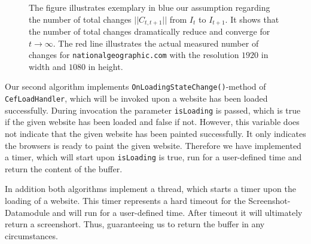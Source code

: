 \begin{figure}
\centering

\caption{The figure illustrates exemplary in blue our assumption regarding the number of total changes $|| C_{t,t+1}||$ from $I_{t}$ to $I_{t+1}$. It shows that the number of total changes dramatically reduce and converge for $t \rightarrow \infty$. The red line illustrates the actual measured number of changes for \texttt{nationalgeographic.com} with the resolution $1920$ in width and $1080$ in height. }
\label{plot_assumption_number_changes}
\end{figure}

Our second algorithm implements \texttt{OnLoadingStateChange()}-method of \texttt{CefLoadHandler}, which will be invoked upon a website has been loaded successfully. During invocation the parameter \texttt{isLoading} is passed, which is true if the given website has been loaded and false if not. However, this variable does not indicate that the given website has been painted successfully. It only indicates the browsers is ready to paint the given website. Therefore we have implemented a timer, which will start upon \texttt{isLoading} is true, run for a user-defined time and return the content of the buffer.

In addition both algorithms implement a thread, which starts a timer upon the loading of a website. This timer represents a hard timeout for the Screenshot-Datamodule and will run for a user-defined time. After timeout it will ultimately return a screenshort. Thus, guaranteeing us to return the buffer  in any circumstances.

